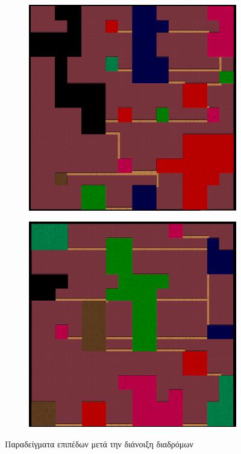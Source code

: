 \begin{figure}[H]
\begin{subfigure}{.5\textwidth}
  \includegraphics[width=.8\linewidth]{../images/colored_rooms/c_3.png}
  \label{fig:sfig1}
\end{subfigure}%
\begin{subfigure}{.5\textwidth}
  \centering
  \includegraphics[width=.8\linewidth]{../images/colored_rooms/c_4.png}
  \label{fig:sfig2}
\end{subfigure}
\caption{Παραδείγματα επιπέδων μετά την διάνοιξη διαδρόμων}
\label{fig:fig}
\end{figure}











